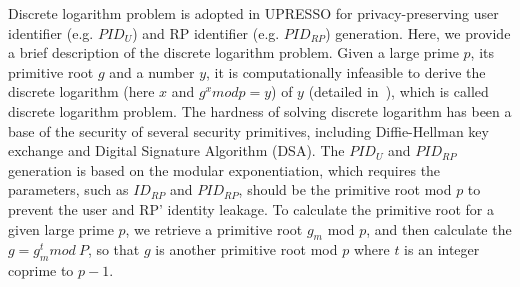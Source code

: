 Discrete logarithm problem is adopted in UPRESSO for privacy-preserving user identifier (e.g. $PID_U$) and RP identifier (e.g. $PID_{RP}$) generation. 
Here, we provide a brief description of the discrete logarithm problem.
Given a large prime $p$, its primitive root $g$ and a number $y$, it is computationally infeasible to derive the discrete logarithm (here $x$ and $g^xmodp=y$) of $y$ (detailed in~\cite{WXWM}), which is called discrete logarithm problem.
The hardness of solving discrete logarithm has been a base of the security of several security primitives, including Diffie-Hellman key exchange and Digital Signature Algorithm (DSA).
The $PID_U$ and $PID_{RP}$ generation is based on the modular exponentiation, which requires the parameters, such as $ID_{RP}$ and $PID_{RP}$, should be the primitive root mod $p$ to prevent the user and RP' identity leakage.  
To calculate the primitive root for a given large prime $p$, we retrieve a primitive root $g_m$ mod $p$, and then calculate the $g = g_{m}^{t} mod \ P$, so that $g$ is another primitive root mod $p$ where $t$ is an integer coprime to $p-1$.

